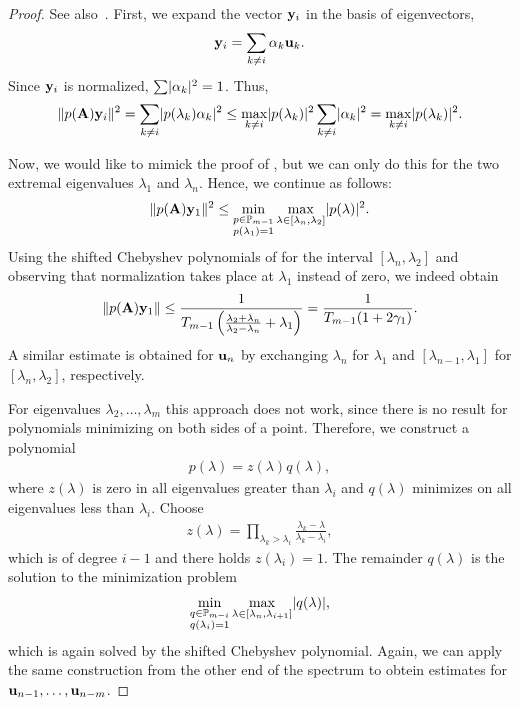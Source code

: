 \begin{proof}
  See also~\cite[Theorem 6.3]{Saad11}.
  First, we expand the vector $\mathbf y_i$ in the basis of eigenvectors,
  \begin{gather}
    \mathbf y_i = \sum_{k\neq i} \alpha_k \mathbf u_k.
  \end{gather}
  Since $\mathbf y_i$ is normalized, $\sum \lvert\alpha_k\rvert^2 = 1$. Thus,
  \begin{gather}
    \lVert p(\mathbf A)\mathbf y_i\rVert^2 = \sum_{k\neq i} \lvert p(\lambda_k)\alpha_k\rvert^2
    \le \max_{k\neq i} \lvert p(\lambda_k)\rvert^2 \sum_{k\neq i} \lvert\alpha_k\rvert^2
    = \max_{k\neq i} \lvert p(\lambda_k)\rvert^2.
  \end{gather}

  Now, we would like to mimick the proof of
  , but we can only do this
  for the two extremal eigenvalues $\lambda_1$ and $\lambda_n$. Hence,
  we continue as follows:
  \begin{gather}
    \lVert p(\mathbf A)\mathbf y_1\rVert^2 \le \min_{\substack{p\in\mathbb P_{m-1}\\p(\lambda_1)=1}}
    \max_{\lambda\in[\lambda_n,\lambda_2]} \lvert p(\lambda)\rvert^2.
  \end{gather}
  Using the shifted Chebyshev polynomials of
   for the interval
  $[\lambda_n,\lambda_2]$ and observing that normalization takes place
  at $\lambda_1$ instead of zero, we indeed obtain
  \begin{gather}
    \lVert p(\mathbf A)\mathbf y_1\rVert
    \le \frac1{T_{m-1}\left(\tfrac{\lambda_2+\lambda_n}{\lambda_2-\lambda_n}+\lambda_1\right)}
    = \frac1{T_{m-1}(1+2\gamma_1)}.
  \end{gather}
  A similar estimate is obtained for $\mathbf u_n$ by exchanging $\lambda_n$
  for $\lambda_1$ and $[\lambda_{n-1},\lambda_1]$ for
  $[\lambda_n,\lambda_2]$, respectively.

  For eigenvalues $\lambda_2,\dots,\lambda_m$ this approach does not work, since there is no result for polynomials minimizing on both sides of a point. Therefore, we construct a polynomial
  \begin{gather}
    p(\lambda) = z(\lambda) q(\lambda),
  \end{gather}
  where $z(\lambda)$ is zero in all eigenvalues greater than
  $\lambda_i$ and $q(\lambda)$ minimizes on all eigenvalues less than
  $\lambda_i$. Choose
  \begin{gather}
    z(\lambda) = \prod_{\lambda_k>\lambda_i} \frac{\lambda_k-\lambda}{\lambda_k-\lambda_i},
  \end{gather}
  which is of degree $i-1$ and there holds $z(\lambda_i) = 1$. The
  remainder $q(\lambda)$ is the solution to the minimization problem
  \begin{gather}
    \min_{\substack{q\in\mathbb P_{m-i}\\q(\lambda_i) = 1}} \max_{\lambda\in[\lambda_n,\lambda_{i+1}]} \lvert q(\lambda)\rvert,
  \end{gather}
  which is again solved by the shifted Chebyshev polynomial. Again, we
  can apply the same construction from the other end of the spectrum
  to obtein estimates for $\mathbf u_{n-1},\dots,\mathbf u_{n-m}$.
\end{proof}

